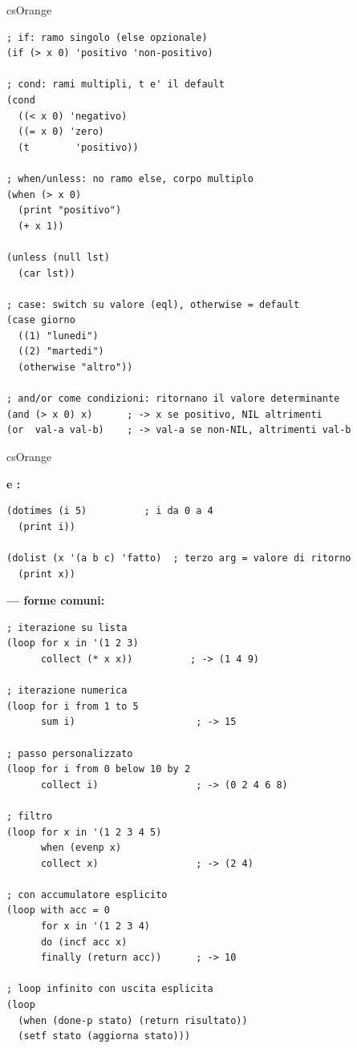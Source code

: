 \begin{refbox}[Condizioni]{csOrange}
\label{sec:condizioni}

\begin{lstlisting}
; if: ramo singolo (else opzionale)
(if (> x 0) 'positivo 'non-positivo)

; cond: rami multipli, t e' il default
(cond
  ((< x 0) 'negativo)
  ((= x 0) 'zero)
  (t        'positivo))

; when/unless: no ramo else, corpo multiplo
(when (> x 0)
  (print "positivo")
  (+ x 1))

(unless (null lst)
  (car lst))

; case: switch su valore (eql), otherwise = default
(case giorno
  ((1) "lunedi")
  ((2) "martedi")
  (otherwise "altro"))

; and/or come condizioni: ritornano il valore determinante
(and (> x 0) x)      ; -> x se positivo, NIL altrimenti
(or  val-a val-b)    ; -> val-a se non-NIL, altrimenti val-b
\end{lstlisting}

\end{refbox}

\begin{refbox}[Iterazione]{csOrange}
\label{sec:iterazione}

\textbf{ e :}\nopagebreak
\begin{lstlisting}
(dotimes (i 5)          ; i da 0 a 4
  (print i))

(dolist (x '(a b c) 'fatto)  ; terzo arg = valore di ritorno
  (print x))
\end{lstlisting}

\textbf{ — forme comuni:}\nopagebreak
\begin{lstlisting}
; iterazione su lista
(loop for x in '(1 2 3)
      collect (* x x))          ; -> (1 4 9)

; iterazione numerica
(loop for i from 1 to 5
      sum i)                     ; -> 15

; passo personalizzato
(loop for i from 0 below 10 by 2
      collect i)                 ; -> (0 2 4 6 8)

; filtro
(loop for x in '(1 2 3 4 5)
      when (evenp x)
      collect x)                 ; -> (2 4)

; con accumulatore esplicito
(loop with acc = 0
      for x in '(1 2 3 4)
      do (incf acc x)
      finally (return acc))      ; -> 10

; loop infinito con uscita esplicita
(loop
  (when (done-p stato) (return risultato))
  (setf stato (aggiorna stato)))
\end{lstlisting}

\end{refbox}


